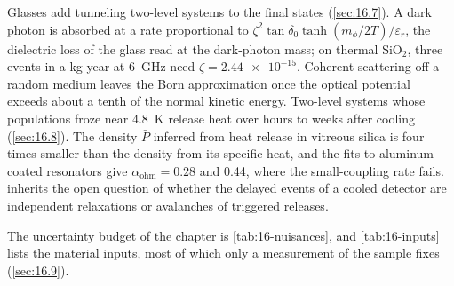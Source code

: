 Glasses add tunneling two-level systems to the final states (\cref{sec:16.7}). A dark photon is absorbed at a rate proportional to $\zeta^2\tan\delta_0\tanh(m_\phi/2T)/\varepsilon_r$, the dielectric loss of the glass read at the dark-photon mass; on thermal SiO$_2$, three events in a kg-year at \SI{6}{GHz} need $\zeta = \num{2.44e-15}$. Coherent scattering off a random medium leaves the Born approximation once the optical potential exceeds about a tenth of the normal kinetic energy. Two-level systems whose populations froze near \SI{4.8}{K} release heat over hours to weeks after cooling (\cref{sec:16.8}). The density $\bar P$ inferred from heat release in vitreous silica is four times smaller than the density from its specific heat, and the fits to aluminum-coated resonators give $\alpha_{\mathrm{ohm}} = 0.28$ and 0.44, where the small-coupling rate fails.  inherits the open question of whether the delayed events of a cooled detector are independent relaxations or avalanches of triggered releases.

The uncertainty budget of the chapter is \cref{tab:16-nuisances}, and \cref{tab:16-inputs} lists the material inputs, most of which only a measurement of the sample fixes (\cref{sec:16.9}).
